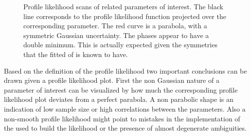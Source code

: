 \begin{figure}[!t]
  \centering
  \begin{subfigure}{0.5\textwidth}
    \raggedright
    \scalebox{0.54}{}
    \caption{}
    \label{nll_f0}
  \end{subfigure}%
  \hfill%
  \begin{subfigure}{0.5\textwidth}
    \raggedleft
    \scalebox{0.54}{}
    \caption{}
    \label{nll_fpar}
  \end{subfigure}
  \begin{subfigure}{0.5\textwidth}
    \raggedright
    \scalebox{0.54}{}
    \caption{}
    \label{nll_AparPhase}
  \end{subfigure}%
  \hfill%
  \begin{subfigure}{0.5\textwidth}
    \raggedleft
    \scalebox{0.54}{}
    \caption{}
    \label{nll_AperpPhase}
  \end{subfigure}
\caption{Profile likelihood scans of \pwave related parameters of interest. The black line corresponds to the profile likelihood
         function projected over the corresponding parameter. The red curve is a parabola, with a symmetric Gaussian
         uncertainty. The phases appear to have a double minimum. This is actually expected given the symmetries that the fitted \pdf
         of  is known to have.}
\end{figure}

Based on the definition of the profile likelihood two important conclusions can be drawn given a profile likelihood plot. First the non
Gaussian nature of a parameter of interest can be visualized by how much the corresponding profile likelihood plot deviates from
a perfect parabola. A non parabolic shape is an indication of low sample size or high correlations between the parameters.
Also a non-smooth profile likelihood might point to mistakes in the implementation of the \pdf used to build the likelihood
or the presence of almost degenerate ambiguities.

